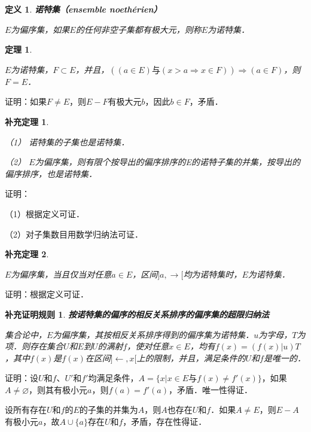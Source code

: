 \documentclass[12pt, a4paper, oneside]{book}
\newtheorem{Ccor}{补充证明规则}
\newtheorem{theo}{定理}
\newtheorem{cor}{补充定理}
\newtheorem{de}{定义}
\begin{document}
			\begin{de}
				\textbf{诺特集（ensemble noethérien）}
				\par
				$E$为偏序集，如果$E$的任何非空子集都有极大元，则称$E$为诺特集．
			\end{de}
			
			\begin{theo}\label{theo171}
				\hfill\par
				$E$为诺特集，$F\subset E$，并且，$((a\in E)\text{与}(x>a\Rightarrow x\in F))\Rightarrow(a\in F)$，则$F=E$．
			\end{theo}
			证明：如果$F\neq E$，则$E-F$有极大元$b$，因此$b\in F$，矛盾．
			
			\begin{cor}\label{cor408}
				\hfill\par
				（1）	诺特集的子集也是诺特集．
				\par
				（2）	$E$为偏序集，则有限个按导出的偏序排序的E的诺特子集的并集，按导出的偏序排序，也是诺特集．
			\end{cor}
			证明：
			\par
			（1）根据定义可证．
			\par
			（2）对子集数目用数学归纳法可证．
			
			\begin{cor}\label{cor409}
				\hfill\par
				$E$为偏序集，当且仅当对任意$a\in E$，区间$]a, \to [$均为诺特集时，$E$为诺特集．
			\end{cor}
			证明：根据定义可证．
						
			\begin{Ccor}\label{Ccor91}
				\textbf{按诺特集的偏序的相反关系排序的偏序集的超限归纳法}
				\par
				集合论中，$E$为偏序集，其按相反关系排序得到的偏序集为诺特集．$u$为字母，$T$为项．则存在集合$U$和$E$到$U$的满射$f$，使对任意$x\in E$，均有$f(x)=(f(x)|u)T$，其中$f(x)$是$f(x)$在区间$]\gets, x[$上的限制，并且，满足条件的$U$和$f$是唯一的．
			\end{Ccor}
			证明：设$U$和$f$、$U'$和$f'$均满足条件，$A=\{x|x\in E\text{与}f(x)\neq f'(x)\}$，如果$A\neq \varnothing$，则其有极小元$a$，则$f(a)=f'(a)$，矛盾．唯一性得证．
			\par
			设所有存在$U$和$f$的$E$的子集的并集为$A$，则$A$也存在$U$和$f$．如果$A\neq E$，则$E-A$有极小元$a$，故$A\cup\{a\}$存在$U$和$f$，矛盾，存在性得证．
			
\end{document}
